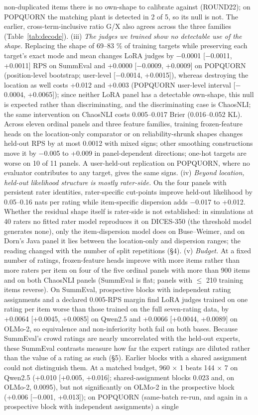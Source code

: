 \documentclass[10pt]{article}
\begin{document}
non-duplicated items there is no own-shape to calibrate against (ROUND22); on POPQUORN the matching plant is detected in 2 of 5, so its null is not. The earlier, cross-term-inclusive ratio G/X also agrees across the three families (Table~\ref{tab:decode}). (iii) \emph{The judges we trained show no detectable use of the shape.} Replacing the shape of 69--83 \% of training targets while preserving each target's exact mode and mean changes LoRA judges by $-$0.0001 {[}$-$0.0011, +0.0011{]} RPS on SummEval and +0.0000 {[}$-$0.0009, +0.0009{]} on POPQUORN (position-level bootstrap; user-level {[}$-$0.0014, +0.0015{]}), whereas destroying the location as well costs +0.012 and +0.003 (POPQUORN user-level interval {[}$-$0.0004, +0.0065{]}); since neither LoRA panel has a detectable own-shape, this null is expected rather than discriminating, and the discriminating case is ChaosNLI; the same intervention on ChaosNLI costs 0.005--0.017 Brier (0.016--0.052 KL). Across eleven ordinal panels and three feature families, training frozen-feature heads on the location-only comparator or on reliability-shrunk shapes changes held-out RPS by at most 0.0012 with mixed signs; other smoothing constructions move it by $-$0.005 to +0.009 in panel-dependent directions; one-hot targets are worse on 10 of 11 panels. A user-held-out replication on POPQUORN, where no evaluator contributes to any target, gives the same signs. (iv) \emph{Beyond location, held-out likelihood structure is mostly rater-side.} On the four panels with persistent rater identities, rater-specific cut-points improve held-out likelihood by 0.05--0.16 nats per rating while item-specific dispersion adds $-$0.017 to +0.012. Whether the residual shape itself is rater-side is not established: in simulations at 40 raters no fitted rater model reproduces it on DICES-350 (the threshold model generates none), only the item-dispersion model does on Buse--Weimer, and on Dorn's Java panel it lies between the location-only and dispersion ranges; the reading changed with the number of split repetitions (\S{}4). (v) \emph{Budget.} At a fixed number of ratings, frozen-feature heads improve with more items rather than more raters per item on four of the five ordinal panels with more than 900 items and on both ChaosNLI panels (SummEval is flat; panels with $\leq$ 210 training items reverse). On SummEval, prospective blocks with independent rating assignments and a declared 0.005-RPS margin find LoRA judges trained on one rating per item worse than those trained on the full seven-rating data, by +0.0064 {[}+0.0045, +0.0085{]} on Qwen2.5 and +0.0066 {[}+0.0044, +0.0089{]} on OLMo-2, so equivalence and non-inferiority both fail on both bases. Because SummEval's crowd ratings are nearly uncorrelated with the held-out experts, these SummEval contrasts measure how far the expert ratings are diluted rather than the value of a rating as such (\S{}5). Earlier blocks with a shared assignment could not distinguish them. At a matched budget, 960 $\times$ 1 beats 144 $\times$ 7 on Qwen2.5 (+0.010 {[}+0.005, +0.016{]}; shared-assignment blocks 0.023 and, on OLMo-2, 0.0095), but not significantly on OLMo-2 in the prospective block (+0.006 {[}$-$0.001, +0.013{]}); on POPQUORN (same-batch re-run, and again in a prospective block with independent assignments) a single 
\end{document}
